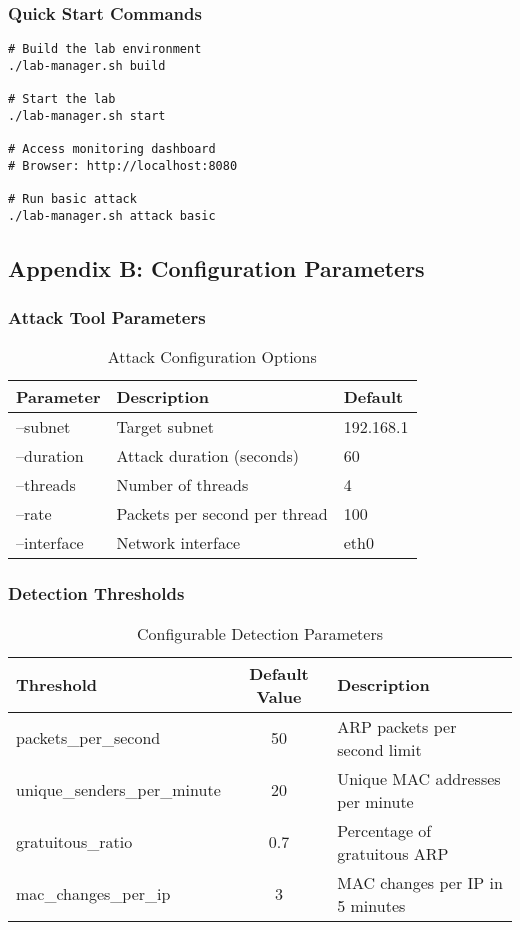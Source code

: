 \documentclass[12pt,a4paper]{article}
\begin{document}
\subsubsection{Quick Start Commands}
\begin{lstlisting}[caption=Setup Commands]
# Build the lab environment
./lab-manager.sh build

# Start the lab
./lab-manager.sh start

# Access monitoring dashboard
# Browser: http://localhost:8080

# Run basic attack
./lab-manager.sh attack basic
\end{lstlisting}

\subsection{Appendix B: Configuration Parameters}

\subsubsection{Attack Tool Parameters}
\begin{table}[H]
\centering
\caption{Attack Configuration Options}
\begin{tabular}{|l|l|l|}
\hline
\textbf{Parameter} & \textbf{Description} & \textbf{Default} \\
\hline
--subnet & Target subnet & 192.168.1 \\
\hline
--duration & Attack duration (seconds) & 60 \\
\hline
--threads & Number of threads & 4 \\
\hline
--rate & Packets per second per thread & 100 \\
\hline
--interface & Network interface & eth0 \\
\hline
\end{tabular}
\end{table}

\subsubsection{Detection Thresholds}
\begin{table}[H]
\centering
\caption{Configurable Detection Parameters}
\begin{tabular}{|l|c|l|}
\hline
\textbf{Threshold} & \textbf{Default Value} & \textbf{Description} \\
\hline
packets\_per\_second & 50 & ARP packets per second limit \\
\hline
unique\_senders\_per\_minute & 20 & Unique MAC addresses per minute \\
\hline
gratuitous\_ratio & 0.7 & Percentage of gratuitous ARP \\
\hline
mac\_changes\_per\_ip & 3 & MAC changes per IP in 5 minutes \\
\hline
\end{tabular}
\end{table}
\end{document}
